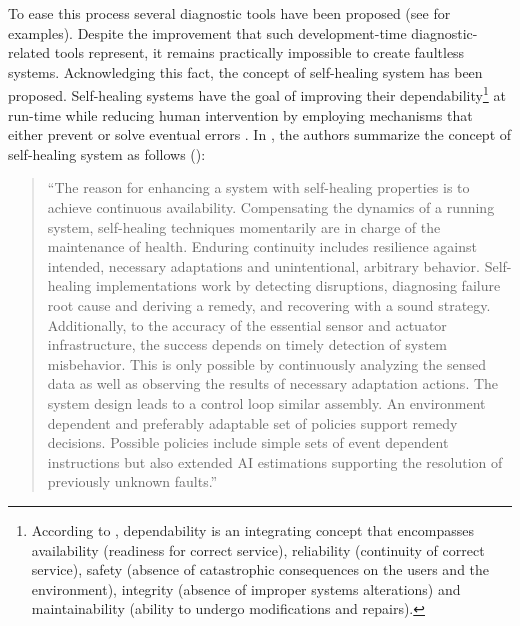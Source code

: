 To ease this process several diagnostic tools have been proposed (see
 for examples).
%
Despite the improvement that such development-time diagnostic-related
tools represent, it remains practically impossible to create faultless
systems.
%
Acknowledging this fact, the concept of self-healing system has been
proposed.
%
Self-healing systems have the goal of improving their
dependability\footnote{According to \cite{Avizienis04}, dependability
  is an integrating concept that encompasses availability (readiness
  for correct service), reliability (continuity of correct service),
  safety (absence of catastrophic consequences on the users and the
  environment), integrity (absence of improper systems alterations)
  and maintainability (ability to undergo modifications and repairs).}
at run-time while reducing human intervention by employing mechanisms
that either prevent or solve eventual errors \cite{Ghosh07}.
%
In \cite{Psaier11}, the authors summarize the concept of self-healing
system as follows ():
%
\vspace{-1em}
\begin{quote}
  ``The reason for enhancing a system with self-healing properties is
  to achieve continuous availability.
  Compensating the dynamics of a running system, self-healing
  techniques momentarily are in charge of the maintenance of health.
  Enduring continuity includes resilience against intended, necessary
  adaptations and unintentional, arbitrary behavior.
  Self-healing implementations work by detecting disruptions,
  diagnosing failure root cause and deriving a remedy, and recovering
  with a sound strategy.
  Additionally, to the accuracy of the essential sensor and actuator
  infrastructure, the success depends on timely detection of system
  misbehavior.
  This is only possible by continuously analyzing the sensed data as
  well as observing the results of necessary adaptation actions.
  The system design leads to a control loop similar assembly.
  An environment dependent and preferably adaptable set of policies
  support remedy decisions.
  Possible policies include simple sets of event dependent
  instructions but also extended AI estimations supporting the
  resolution of previously unknown faults.''
\end{quote}%
\vspace{-0.1em}
